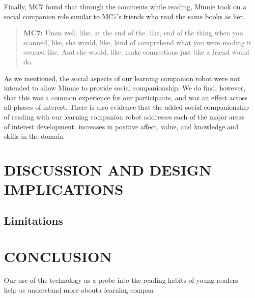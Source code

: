 \documentclass{sigchi}
\begin{document}
 Finally, MC7 found that through the comments while reading, Minnie took on a social companion role similar to MC7's friends who read the same books as her.
 
	 \begin{quote}
	 	  \textbf{MC7:} Umm well, like, at the end of the, like, end of the thing when you scanned, like, she would, like, kind of comprehend what you were reading it seemed like. And she would, like, make connections just like a friend would do. 
	 	  
	 \end{quote}
 
As we mentioned, the social aspects of our learning companion robot were not intended to allow Minnie to provide social companionship.  We do find, however, that this was a common experience for our participants, and was an effect across all phases of interest.  There is also evidence that the added social companionship of reading with our learning companion robot addresses each of the major areas of interest development: increases in positive affect, value, and knowledge and skills in the domain.  

\section{DISCUSSION AND DESIGN IMPLICATIONS}

\subsection{Limitations}

\section{CONCLUSION}
Our use of the technology as a probe into the reading habits of young readers help us understand more abouta learning compan


%
\end{document}
